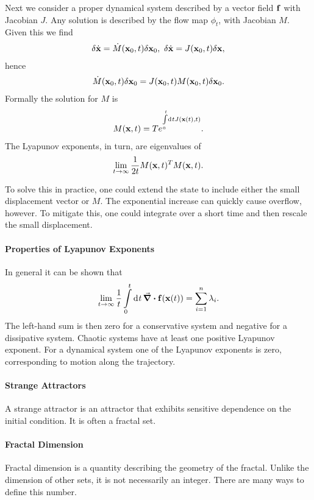 Next we consider a proper dynamical system described by a vector field $\vb{f}$ with Jacobian $J$. Any solution is described by the flow map $\phi_{t}$, with Jacobian $M$. Given this we find
\begin{align*}
	\delta\dot{\vb{x}} = \dot{M}(\vb{x}_{0}, t)\delta\vb{x}_{0},\ \delta\dot{\vb{x}} = J(\vb{x}_{0}, t)\delta\vb{x},
\end{align*}
hence
\begin{align*}
	\dot{M}(\vb{x}_{0}, t)\delta\vb{x}_{0} = J(\vb{x}_{0}, t)M(\vb{x}_{0}, t)\delta\vb{x}_{0}.
\end{align*}
Formally the solution for $M$ is
\begin{align*}
	M(\vb{x}, t) = \torp e^{\integ[]{0}{t}{t}{J(\vb{x}(t), t)}}.
\end{align*}
The Lyapunov exponents, in turn, are eigenvalues of
\begin{align*}
	\lim\limits_{t\to\infty}\frac{1}{2t}M(\vb{x}, t)^{T}M(\vb{x}, t).
\end{align*}

To solve this in practice, one could extend the state to include either the small displacement vector or $M$. The exponential increase can quickly cause overflow, however. To mitigate this, one could integrate over a short time and then rescale the small displacement.

\paragraph{Properties of Lyapunov Exponents}
In general it can be shown that
\begin{align*}
	\lim\limits_{t\to\infty}\frac{1}{t}\integ{0}{t}{t}{\div{\vb{f}}(\vb{x}(t))} = \sum\limits_{i = 1}^{n}\lambda_{i}.
\end{align*}
The left-hand sum is then zero for a conservative system and negative for a dissipative system. Chaotic systems have at least one positive Lyapunov exponent. For a dynamical system one of the Lyapunov exponents is zero, corresponding to motion along the trajectory.

\paragraph{Strange Attractors}
A strange attractor is an attractor that exhibits sensitive dependence on the initial condition. It is often a fractal set.

\paragraph{Fractal Dimension}
Fractal dimension is a quantity describing the geometry of the fractal. Unlike the dimension of other sets, it is not necessarily an integer. There are many ways to define this number.

